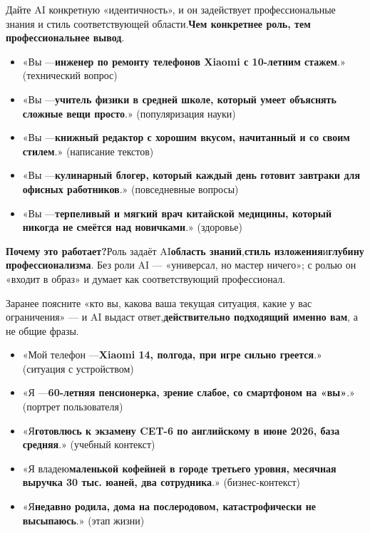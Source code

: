 
Дайте AI конкретную «идентичность», и он задействует профессиональные знания и стиль соответствующей области.\textbf{Чем конкретнее роль, тем профессиональнее вывод}.


\begin{itemize}
  \item «Вы —\textbf{инженер по ремонту телефонов Xiaomi с 10-летним стажем}.» (технический вопрос)
  \item «Вы —\textbf{учитель физики в средней школе, который умеет объяснять сложные вещи просто}.» (популяризация науки)
  \item «Вы —\textbf{книжный редактор с хорошим вкусом, начитанный и со своим стилем}.» (написание текстов)
  \item «Вы —\textbf{кулинарный блогер, который каждый день готовит завтраки для офисных работников}.» (повседневные вопросы)
  \item «Вы —\textbf{терпеливый и мягкий врач китайской медицины, который никогда не смеётся над новичками}.» (здоровье)
\end{itemize}

\textbf{Почему это работает?}Роль задаёт AI\textbf{область знаний},\textbf{стиль изложения}и\textbf{глубину профессионализма}. Без роли AI — «универсал, но мастер ничего»; с ролью он «входит в образ» и думает как соответствующий профессионал.


Заранее поясните «кто вы, какова ваша текущая ситуация, какие у вас ограничения» — и AI выдаст ответ,\textbf{действительно подходящий именно вам}, а не общие фразы.


\begin{itemize}
  \item «Мой телефон —\textbf{Xiaomi 14, полгода, при игре сильно греется}.» (ситуация с устройством)
  \item «Я —\textbf{60-летняя пенсионерка, зрение слабое, со смартфоном на «вы»}.» (портрет пользователя)
  \item «Я\textbf{готовлюсь к экзамену CET-6 по английскому в июне 2026, база средняя}.» (учебный контекст)
  \item «Я владею\textbf{маленькой кофейней в городе третьего уровня, месячная выручка 30 тыс. юаней, два сотрудника}.» (бизнес-контекст)
  \item «Я\textbf{недавно родила, дома на послеродовом, катастрофически не высыпаюсь}.» (этап жизни)
\end{itemize}


